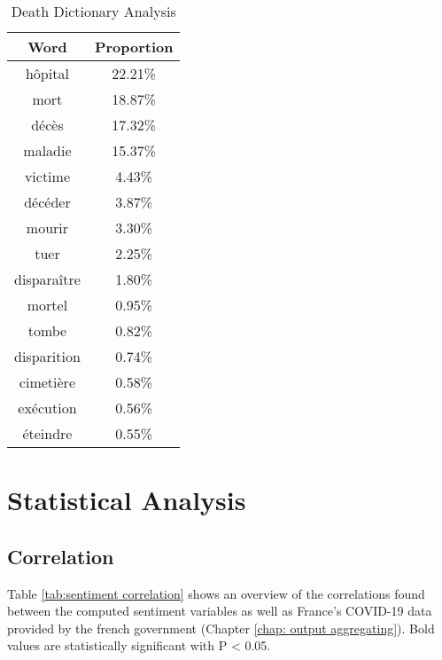 \begin{table}[]
\caption{Death Dictionary Analysis}
\label{tab:death freqs}
\centering
\begin{tabular}{@{}cc@{}}
\toprule
Word      & Proportion \\ \midrule
hôpital     & 22.21\% \\
mort        & 18.87\% \\
décès       & 17.32\% \\
maladie     & 15.37\% \\
victime     & 4.43\%  \\
décéder     & 3.87\%  \\
mourir      & 3.30\%  \\
tuer        & 2.25\%  \\
disparaître & 1.80\%  \\
mortel      & 0.95\%  \\
tombe       & 0.82\%  \\
disparition & 0.74\%  \\
cimetière   & 0.58\%  \\
exécution   & 0.56\%  \\
éteindre    & 0.55\%  \\ \bottomrule
\end{tabular}
\end{table}

\section{Statistical Analysis}

\subsection{Correlation}

Table \ref{tab:sentiment correlation} shows an overview of the correlations found between the computed sentiment variables as well as France's COVID-19 data provided by the french government (Chapter \ref{chap: output aggregating}). Bold values are statistically significant with P < 0.05.

